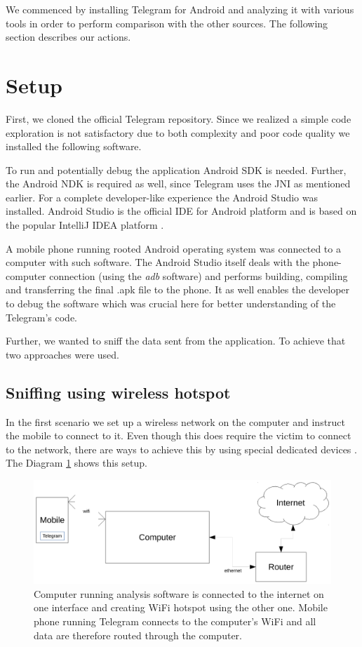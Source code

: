 \documentclass[thesis=M,english]{FITthesis}[2012/10/20]
\begin{document}
We commenced by installing Telegram for Android and analyzing it with various tools in order to perform comparison with the other sources. The following section describes our actions.

\section{Setup}\label{analysis-setup}

First, we cloned the official Telegram repository. Since we realized a simple code exploration is not satisfactory due to both complexity and poor code quality we installed the following software.

To run and potentially debug the application Android SDK is needed. Further, the Android NDK is required as well, since Telegram uses the JNI as mentioned earlier. For a complete developer-like experience the Android Studio was installed. Android Studio is the official IDE for Android platform and is based on the popular IntelliJ IDEA platform \cite{android-studio}.

A mobile phone running rooted Android operating system was connected to a computer with such software. The Android Studio itself deals with the phone-computer connection (using the \emph{adb} software) and performs building, compiling and transferring the final .apk file to the phone. It as well enables the developer to debug the software which was crucial here for better understanding of the Telegram's code.

Further, we wanted to sniff the data sent from the application. To achieve that two approaches were used.

\subsection{Sniffing using wireless hotspot}

In the first scenario we set up a wireless network on the computer and instruct the mobile to connect to it. Even though this does require the victim to connect to the network, there are ways to achieve this by using special dedicated devices \cite{pineapple}. The Diagram \ref{img:analysis-setup-hotspot} shows this setup.

\begin{figure}[htb]
	\centering
	\includegraphics[width=1\textwidth]{setup-hotspot.pdf}
	\caption{Computer running analysis software is connected to the internet on one interface and creating WiFi hotspot using the other one. Mobile phone running Telegram connects to the computer's WiFi and all data are therefore routed through the computer.}
	\label{img:analysis-setup-hotspot}
\end{figure}
\end{document}
